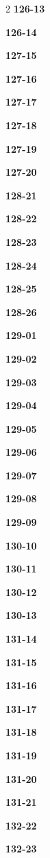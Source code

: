 \documentclass[10pt,a4paper]{article}
\begin{document}
\begin{multicols}{2}
\noindent\textbf{126-13}\ \par
\noindent\textbf{126-14}\ \par
\noindent\textbf{127-15}\ \par
\noindent\textbf{127-16}\ \par
\noindent\textbf{127-17}\ \par
\noindent\textbf{127-18}\ \par
\noindent\textbf{127-19}\ \par
\noindent\textbf{127-20}\ \par
\noindent\textbf{128-21}\ \par
\noindent\textbf{128-22}\ \par
\noindent\textbf{128-23}\ \par
\noindent\textbf{128-24}\ \par
\noindent\textbf{128-25}\ \par
\noindent\textbf{128-26}\ \par
\noindent\textbf{129-01}\ \par
\noindent\textbf{129-02}\ \par
\noindent\textbf{129-03}\ \par
\noindent\textbf{129-04}\ \par
\noindent\textbf{129-05}\ \par
\noindent\textbf{129-06}\ \par
\noindent\textbf{129-07}\ \par
\noindent\textbf{129-08}\ \par
\noindent\textbf{129-09}\ \par
\noindent\textbf{130-10}\ \par
\noindent\textbf{130-11}\ \par
\noindent\textbf{130-12}\ \par
\noindent\textbf{130-13}\ \par
\noindent\textbf{131-14}\ \par
\noindent\textbf{131-15}\ \par
\noindent\textbf{131-16}\ \par
\noindent\textbf{131-17}\ \par
\noindent\textbf{131-18}\ \par
\noindent\textbf{131-19}\ \par
\noindent\textbf{131-20}\ \par
\noindent\textbf{131-21}\ \par
\noindent\textbf{132-22}\ \par
\noindent\textbf{132-23}\ \par

\end{multicols}
\end{document}

